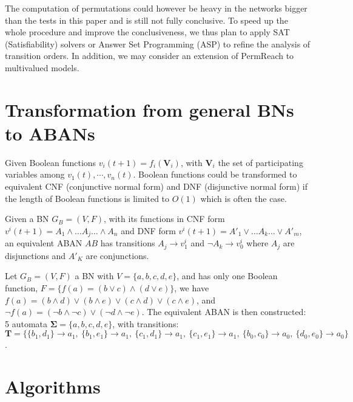 \documentclass[runningheads]{llncs}
\newcommand{\acm}[3]{\{#1\}\rightarrow#3}
\begin{document}
The computation of permutations could however be heavy in the networks bigger than the tests in this paper and is still not fully conclusive. 
To speed up the whole procedure and improve the conclusiveness, we thus plan to apply SAT (Satisfiability) solvers or Answer Set Programming (ASP) to refine the analysis of transition orders. 
In addition, we may consider an extension of PermReach to multivalued models.



\appendix
\section{Transformation from general BNs to ABANs}\label{appendix:trans}

Given Boolean functions $v_i(t+1)=f_i(\mathbf{V}_i)$, with $\mathbf{V}_i$ the set of participating variables among $v_1(t),\cdots,v_n(t)$.
Boolean functions could be transformed to equivalent CNF (conjunctive normal form) and DNF (disjunctive normal form) if the length of Boolean functions is limited to $O(1)$ \cite{miltersen2005converting} which is often the case.
\begin{proposition}
Given a BN $G_B=(V,F)$, with its functions in CNF form $v^i(t+1)=A_1\land\ldots A_j \ldots\land A_n$ and DNF form $v^i(t+1)=A'_1\lor\ldots A_k\ldots\lor A'_m$, an equivalent ABAN $AB$ has transitions $A_j\to v^i_1$ and $\lnot A_k\to v^i_0$ where $A_j$ are disjunctions and $A'_K$ are conjunctions.
\end{proposition}
\begin{example}
Let $G_B=(V,F)$ a BN with $V=\{a,b,c,d,e\}$, and has only one Boolean function, $F=\{f(a)= (b\lor c)\land(d\lor e)\}$, we have 
$f(a)=(b\land d)\lor(b\land e)\lor(c\land d)\lor(c\land e)$, and $\lnot f(a)=(\lnot b\land \lnot c)\lor(\lnot d\land \lnot e)$. 
The equivalent ABAN is then constructed: 5 automata $\mathbf{\Sigma}=\{a,b,c,d,e\}$, with transitions: $\mathbf{T}=\{\acm{b_1,d_1}{a_0}{a_1},\ \acm{b_1,e_1}{a_0}{a_1},\ \acm{c_1,d_1}{a_0}{a_1},\ \acm{c_1,e_1}{a_0}{a_1},\ \acm{b_0,c_0}{a_1}{a_0},\ \acm{d_0,e_0}{a_1}{a_0}\}$.
\end{example}

\section{Algorithms}\label{appendix:algo}
\end{document}
